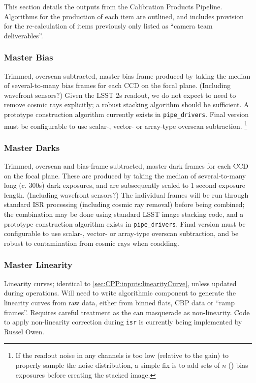 This section details the outputs from the Calibration Products Pipeline. Algorithms for the production of each item are outlined, and includes provision for the re-calculation of items previously only listed as ``camera team deliverables''.

\subsubsection{Master Bias}\label{sec:CPP:output:bias}
Trimmed, overscan subtracted, master bias frame produced by taking the median of several-to-many bias frames for each CCD on the focal plane. \rednote (Including wavefront sensors?)
\alg Given the LSST 2s readout, we do not expect to need to remove cosmic rays explicitly; a robust stacking algorithm should be sufficient. A prototype construction algorithm currently exists in \texttt{pipe\_drivers}. Final version must be configurable to use scalar-, vector- or array-type overscan subtraction. 
\footnote{If the readout noise in any channels is too low (relative to the
gain) to properly sample the noise distribution, a simple fix is to add sets of $n$ () bias exposures before creating the stacked image.}


\subsubsection{Master Darks}\label{sec:CPP:output:dark}
Trimmed, overscan and bias-frame subtracted, master dark frames for each CCD on the focal plane. These are produced by taking the median of several-to-many long (c. 300s) dark exposures, and are subsequently scaled to 1 second exposure length. \rednote (Including wavefront sensors?)
\alg The individual frames will be run through standard ISR processing (including cosmic ray removal) before
being combined; the combination may be done using standard LSST image stacking code, and a prototype construction algorithm exists in \texttt{pipe\_drivers}. Final version must be configurable to use scalar-, vector- or array-type overscan subtraction, and be robust to contamination from cosmic rays when coadding.


\subsubsection{Master Linearity}\label{sec:CPP:output:linearityCurve}
Linearity curves; identical to \secsymbol\ref{sec:CPP:inputs:linearityCurve}, unless updated during operations.
\alg Will need to write algorithmic component to generate the linearity curves from raw data, either from binned flats, CBP data or ``ramp frames''. Requires careful treatment as the \bfeffect can masquerade as non-linearity. Code to apply non-linearity correction during \texttt{isr} is currently being implemented by Russel Owen.


